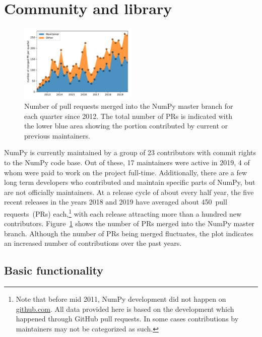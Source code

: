 \section{Community and library}

\begin{figure}
    \centering
    \includegraphics[width=0.5\textwidth]{scripts/PRs-using-CURRENT_MAINTAINERS.pdf}
    \caption{Number of pull requests merged into the NumPy master branch for each
        quarter since 2012. The total number of PRs is indicated with the
        lower blue area showing the portion contributed by current or previous
        maintainers.}\label{fig:prs-over-time}
\end{figure}


NumPy is currently maintained by a group of 23 contributors with commit rights
to the NumPy code base. Out of these, 17 maintainers were active in
2019, 4 of whom were paid to work on the project full-time.
Additionally, there are a few long term developers who contributed and maintain
specific parts of NumPy, but are not officially maintainers.
At a release cycle of about every half year, the five recent releases in the years
2018 and 2019 have averaged about 450~pull requests~(PRs) each,\footnote{
    Note that before mid 2011, NumPy development did not happen on \url{github.com}.
    All data provided here is based on the development which happened through GitHub
    pull requests. In some cases contributions by maintainers may not be categorized as such.}
with each release attracting more than a hundred new contributors.
Figure~\ref{fig:prs-over-time} shows the number of PRs merged into the NumPy
master branch.
Although the number of PRs being merged fluctuates,
the plot indicates an increased number of contributions over the past
years.


\subsection{Basic functionality}

